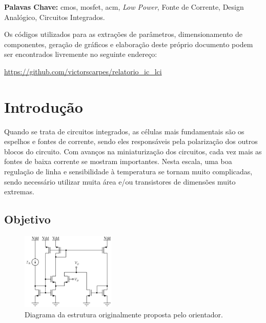 \documentclass[10pt,a4paper]{extreport}
\newcommand{\?}{\stackrel{?}{=}}
\begin{document}
\textbf{Palavas Chave:} \acrshort{cmos}, \acrshort{mosfet}, \acrshort{acm}, \textit{Low Power}, Fonte de Corrente, Design Analógico, Circuitos Integrados.

\newpage
{}
\listoffigures
\newpage
{}
\printglossary[type=\acronymtype, title=Lista de Siglas e Acrônimos]


\newpage
Os códigos utilizados para as extrações de parâmetros, dimensionamento de componentes, geração de gráficos e elaboração deste próprio documento podem ser encontrados livremente no seguinte endereço:

\url{https://github.com/victorscarpes/relatorio_ic_lci}

\newpage

\setcounter{chapter}{0}
\chapter{Introdução}

Quando se trata de circuitos integrados, as células mais fundamentais são os espelhos e fontes de corrente, sendo eles responsáveis pela polarização dos outros blocos do circuito. Com avanços na miniaturização dos circuitos, cada vez mais as fontes de baixa corrente se mostram importantes. Nesta escala, uma boa regulação de linha e sensibilidade à temperatura se tornam muito complicadas, sendo necessário utilizar muita área e/ou transistores de dimensões muito extremas.

\section{Objetivo}

\begin{figure}
    \centering
    \vspace{-0.4cm}
    \includegraphics[width=0.4\textwidth]{Imagens/original_source.jpg}
    \caption{Diagrama da estrutura originalmente proposta pelo orientador.}
    \label{fig:original_source}
\end{figure}
\end{document}
